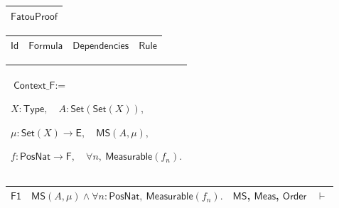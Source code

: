 \documentclass[11pt]{amsart}
\renewcommand{\arraystretch}{1.4}
\newlength{\FTCOneColumnBody}
\newlength{\FTCFourColumnBody}
\begin{document}
{\centering
\renewcommand{\arraystretch}{1.4}
\par\setlength{\parskip}{0pt}\nointerlineskip
\noindent
\begin{tabular}{|@{}>{\centering\arraybackslash}m{\FTCOneColumnBody}|}\hline
$\displaystyle \textsf{FatouProof}$\\ \hline
\end{tabular}%
\par\setlength{\parskip}{0pt}\nointerlineskip
\noindent
\begin{tabular}{|@{}>{\centering\arraybackslash}m{0.078431\FTCFourColumnBody}|>{\centering\arraybackslash}m{0.535947\FTCFourColumnBody}|>{\centering\arraybackslash}m{0.281045\FTCFourColumnBody}|>{\centering\arraybackslash}m{0.104575\FTCFourColumnBody}|}\hline
$\displaystyle \textsf{Id}$ & $\displaystyle \textsf{Formula}$ & $\displaystyle \textsf{Dependencies}$ & $\displaystyle \textsf{Rule}$\\ \hline
\end{tabular}%
\par\setlength{\parskip}{0pt}\nointerlineskip
\noindent
\begin{tabular}{|@{}>{\centering\arraybackslash}m{\FTCOneColumnBody}|}\hline
$\displaystyle \textsf{Context\_F}:=$\par
$\displaystyle X:\textsf{Type},\quad A:\textsf{Set}(\textsf{Set}(X)),$\par
$\displaystyle \mu:\textsf{Set}(X)\to\textsf{E},\quad\textsf{MS}(A,\mu),$\par
$\displaystyle f:\textsf{PosNat}\to\textsf{F},\quad\forall n,\ \textsf{Measurable}(f_n).$\\ \hline
\end{tabular}%
\par\setlength{\parskip}{0pt}\nointerlineskip
\noindent
\begin{tabular}{|@{}>{\centering\arraybackslash}m{0.078431\FTCFourColumnBody}|>{\centering\arraybackslash}m{0.535947\FTCFourColumnBody}|>{\centering\arraybackslash}m{0.281045\FTCFourColumnBody}|>{\centering\arraybackslash}m{0.104575\FTCFourColumnBody}|}\hline
\hypertarget{proof:F1}{$\displaystyle \textsf{F1}$} & $\displaystyle \textsf{MS}(A,\mu)\land\forall n:\textsf{PosNat},\ \textsf{Measurable}(f_n).$ & \hyperlink{def:MS}{$\displaystyle \textsf{MS}$}, \hyperlink{def:Meas}{$\displaystyle \textsf{Meas}$}, \hyperlink{ax:Order}{$\displaystyle \textsf{Order}$} & $\displaystyle \vdash$\\ \hline
\end{tabular}%
\par\setlength{\parskip}{0pt}\nointerlineskip
}
\end{document}

